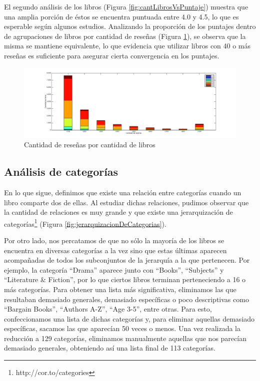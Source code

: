 \documentclass[12pt,journal,compsoc]{IEEEtran}
\begin{document}
El segundo análisis de los libros (Figura \ref{fig:cantLibrosVsPuntaje}) muestra que una amplia porción de éstos se encuentra puntuada entre 4.0 y 4.5, lo que es esperable según algunos estudios\cite{zhang}. Analizando la proporción de los puntajes dentro de agrupaciones de libros por cantidad de reseñas (Figura \ref{fig:cantReseVsCantLibros}), se observa que la misma se mantiene equivalente, lo que evidencia que utilizar libros con 40 o más reseñas es suficiente para asegurar cierta convergencia en los puntajes.

\begin{figure}[H]
  \centering
  \includegraphics[width=7.0in]{imgs/cantLibrosVScantReviews.png}
  \caption{\small Cantidad de reseñas por cantidad de libros}
  \label{fig:cantReseVsCantLibros}
\end{figure}

\subsection{Análisis de categorías}

En lo que sigue, definimos que existe una relación entre categorías cuando un libro comparte dos de ellas. Al estudiar dichas relaciones, pudimos observar que la cantidad de relaciones es muy grande y que existe una jerarquización de categorías\footnote{http://cor.to/categories} (Figura \ref{fig:jerarquizacionDeCategorias}).

Por otro lado, nos percatamos de que no sólo la mayoría de los libros se encuentra en diversas categorías a la vez sino que estas últimas aparecen acompañadas de todos los subconjuntos de la jerarquía a la que pertenecen. Por ejemplo, la categoría ``Drama'' aparece junto con ``Books'', ``Subjects'' y ``Literature \& Fiction'', por lo que ciertos libros terminan perteneciendo a 16 o más categorías. Para obtener una lista más significativa, eliminamos las que resultaban demasiado generales, demasiado específicas o poco descriptivas como ``Bargain Books'', ``Authors A-Z'', ``Age 3-5'', entre otras. Para esto, confeccionamos una lista de dichas categorías y, para eliminar aquellas demasiado específicas, sacamos las que aparecían 50 veces o menos. Una vez realizada la reducción a 129 categorías, eliminamos manualmente aquellas que nos parecían demasiado generales, obteniendo así una lista final de 113 categorías.
\end{document}
